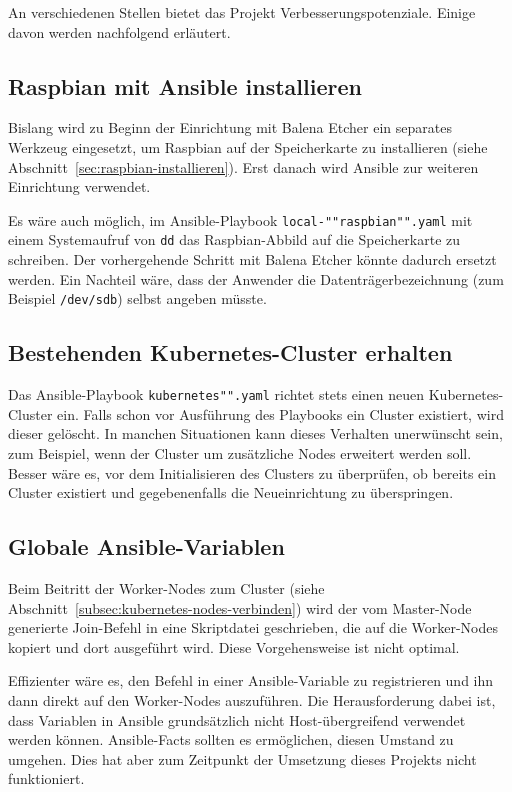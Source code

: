 An verschiedenen Stellen bietet das Projekt Verbesserungspotenziale.
Einige davon werden nachfolgend erläutert.

\subsection{Raspbian mit Ansible installieren}

Bislang wird zu Beginn der Einrichtung mit Balena Etcher ein separates Werkzeug eingesetzt, um Raspbian auf der Speicherkarte zu installieren (siehe Abschnitt~\ref{sec:raspbian-installieren}).
Erst danach wird Ansible zur weiteren Einrichtung verwendet.

Es wäre auch möglich, im Ansible-Playbook \texttt{local-""raspbian"".yaml} mit einem Systemaufruf von \texttt{dd} das Raspbian-Abbild auf die Speicherkarte zu schreiben.
Der vorhergehende Schritt mit Balena Etcher könnte dadurch ersetzt werden.
Ein Nachteil wäre, dass der Anwender die Datenträgerbezeichnung (zum Beispiel \texttt{/dev/sdb}) selbst angeben müsste.

\subsection{Bestehenden Kubernetes-Cluster erhalten}

Das Ansible-Playbook \texttt{kubernetes"".yaml} richtet stets einen neuen Kubernetes-Cluster ein.
Falls schon vor Ausführung des Playbooks ein Cluster existiert, wird dieser gelöscht.
In manchen Situationen kann dieses Verhalten unerwünscht sein, zum Beispiel, wenn der Cluster um zusätzliche Nodes erweitert werden soll.
Besser wäre es, vor dem Initialisieren des Clusters zu überprüfen, ob bereits ein Cluster existiert und gegebenenfalls die Neueinrichtung zu überspringen.

\subsection{Globale Ansible-Variablen}

Beim Beitritt der Worker-Nodes zum Cluster (siehe Abschnitt~\ref{subsec:kubernetes-nodes-verbinden}) wird der vom Master-Node generierte Join-Befehl in eine Skriptdatei geschrieben, die auf die Worker-Nodes kopiert und dort ausgeführt wird.
Diese Vorgehensweise ist nicht optimal.

Effizienter wäre es, den Befehl in einer Ansible-Variable zu registrieren und ihn dann direkt auf den Worker-Nodes auszuführen.
Die Herausforderung dabei ist, dass Variablen in Ansible grundsätzlich nicht Host-übergreifend verwendet werden können.
Ansible-Facts sollten es ermöglichen, diesen Umstand zu umgehen.
Dies hat aber zum Zeitpunkt der Umsetzung dieses Projekts nicht funktioniert.
